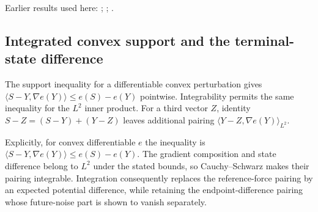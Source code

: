 \documentclass[11pt,a4paper]{report}
\begin{document}
Earlier results used here: \cite[Section~3.13.2]{LangevinLean2026ULASC}; \cite[Section~3.13.3]{LangevinLean2026ULASC}; \cite[Section~3.11.1]{LangevinLean2026IPLA}.
\subsection{\texorpdfstring{Integrated convex support and the terminal-state difference}{Integrated convex support and the terminal-state difference}}
\label{report-step-ProximalLangevin-SplittingL2Energy-lean-4}


The support inequality for a differentiable convex perturbation gives \(\langle S-Y,\nabla e(Y)\rangle\le e(S)-e(Y)\) pointwise. Integrability permits the same inequality for the \(L^2\) inner product. For a third vector \(Z\), identity \(S-Z=(S-Y)+(Y-Z)\) leaves additional pairing \(\langle Y-Z,\nabla e(Y)\rangle_{L^2}\).



Explicitly, for convex differentiable \(e\) the inequality is \(\langle S-Y,\nabla e(Y)\rangle\le e(S)-e(Y)\). The gradient composition and state difference belong to \(L^2\) under the stated bounds, so Cauchy–Schwarz makes their pairing integrable. Integration consequently replaces the reference-force pairing by an expected potential difference, while retaining the endpoint-difference pairing whose future-noise part is shown to vanish separately.
\end{document}
